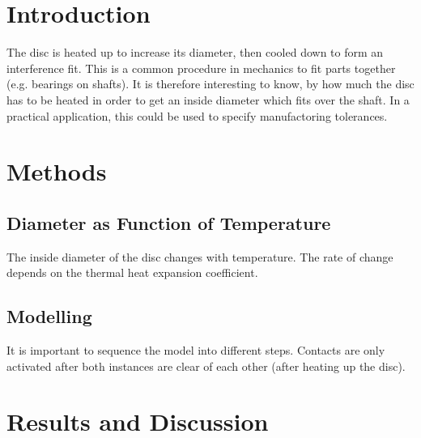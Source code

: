 \documentclass[12pt]{article}
\begin{document}
\tableofcontents
\pagebreak
\section{Introduction}

The disc is heated up to increase its diameter, then cooled down to form an interference fit.
This is a common procedure in mechanics to fit parts together (e.g. bearings on shafts).
It is therefore interesting to know, by how much the disc has to be heated in order to
get an inside diameter which fits over the shaft. In a practical application, this could be used
to specify manufactoring tolerances.


\newpage
\section{Methods}

\subsection{Diameter as Function of Temperature}

The inside diameter of the disc changes with temperature. The rate of change 
depends on the thermal heat expansion coefficient.




\subsection{Modelling}

It is important to sequence the model into different steps. 
Contacts are only activated after both
instances are clear of each other (after heating up the disc).







\pagebreak
\section{Results and Discussion}
\end{document}
